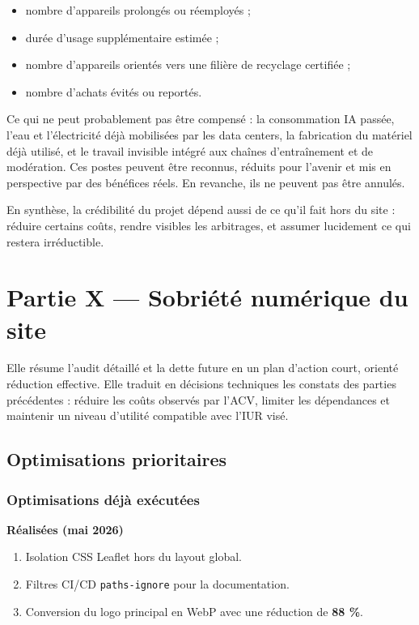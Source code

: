 \documentclass[
  10pt,
  a4paper,
  DIV=11,
  numbers=noendperiod,
  oneside]{scrreprt}
\providecommand{\tightlist}{%
  \setlength{\itemsep}{0pt}\setlength{\parskip}{0pt}}
\let\oldtextbf\textbf
\renewcommand{\textbf}[1]{\oldtextbf{\textcolor{cmmnavy}{#1}}}
\begin{document}
\begin{itemize}
\tightlist
\item
  nombre d'appareils prolongés ou réemployés ;
\item
  durée d'usage supplémentaire estimée ;
\item
  nombre d'appareils orientés vers une filière de recyclage certifiée ;
\item
  nombre d'achats évités ou reportés.
\end{itemize}

Ce qui ne peut probablement pas être compensé : la consommation IA
passée, l'eau et l'électricité déjà mobilisées par les data centers, la
fabrication du matériel déjà utilisé, et le travail invisible intégré
aux chaînes d'entraînement et de modération. Ces postes peuvent être
reconnus, réduits pour l'avenir et mis en perspective par des bénéfices
réels. En revanche, ils ne peuvent pas être annulés.

En synthèse, la crédibilité du projet dépend aussi de ce qu'il fait hors
du site : réduire certains coûts, rendre visibles les arbitrages, et
assumer lucidement ce qui restera irréductible.

\chapter{Partie X --- Sobriété numérique du
site}\label{partie-x-sobriete-numerique-du-site}

Elle résume l'audit détaillé et la dette future en un plan d'action
court, orienté réduction effective. Elle traduit en décisions techniques
les constats des parties précédentes : réduire les coûts observés par
l'ACV, limiter les dépendances et maintenir un niveau d'utilité
compatible avec l'IUR visé.

\section{Optimisations prioritaires}\label{optimisations-prioritaires}

\subsection{Optimisations déjà
exécutées}\label{optimisations-duxe9juxe0-exuxe9cutuxe9es}

\textbf{Réalisées (mai 2026)}

\begin{enumerate}
\def\labelenumi{\arabic{enumi}.}
\tightlist
\item
  Isolation CSS Leaflet hors du layout global.
\item
  Filtres CI/CD \texttt{paths-ignore} pour la documentation.
\item
  Conversion du logo principal en WebP avec une réduction de \textbf{88
  \%}.
\end{enumerate}
\end{document}
